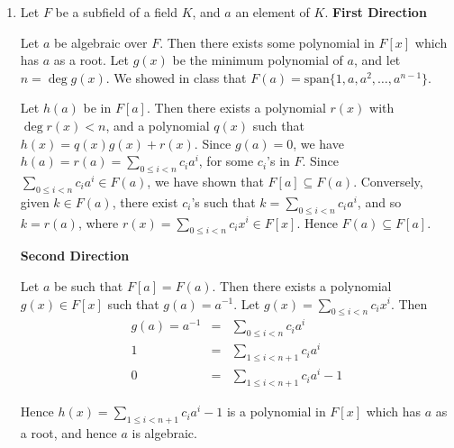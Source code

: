 \documentclass[11pt]{article} \usepackage{amssymb}
\begin{document}
\begin{enumerate}
\begin{itemize}
    \end{itemize}  

  \item
    Let $F$ be a subfield of a field $K$, and $a$ an element of $K$.
    {\bf First Direction}

    Let $a$ be algebraic over $F$. Then there exists some polynomial in $F[x]$
    which has $a$ as a root. Let $g(x)$ be the minimum polynomial of $a$, and
    let $n=\deg g(x)$. 
    We showed in class that $F(a)=\mbox{span}\{1, a, a^2, \ldots, a^{n-1}\}$. 
    
    Let $h(a)$ be in $F[a]$. 
    Then there exists a polynomial
    $r(x)$ with $\deg r(x) < n$, and a polynomial $q(x)$ such that 
    $h(x)=q(x)g(x)+r(x)$. Since $g(a)=0$, we have 
    $h(a)=r(a)=\sum_{0\leq i <n}c_ia^i$, for some $c_i$'s in $F$. Since
    $\sum_{0\leq i <n}c_ia^i \in F(a)$, we have shown that $F[a] \subseteq F(a)$. 
    Conversely, given $k \in F(a)$, there exist $c_i$'s such that $k=\sum_{0\leq i <n}c_ia^i$,
    and so $k=r(a)$, where $r(x)=\sum_{0\leq i <n}c_ix^i \in F[x]$. 
    Hence $F(a) \subseteq F[a]$.

    {\bf Second Direction}

    Let $a$ be such that $F[a]=F(a)$. Then there exists a polynomial 
    $g(x) \in F[x]$ such that $g(a)=a^{-1}$. Let $g(x)=\sum_{0\leq i < n}c_ix^i$. Then
    \begin{eqnarray*}
      g(a)=a^{-1}&=&\sum_{0\leq i < n}c_ia^i
      \\ 1 &=& \sum_{1\leq i < n + 1}c_ia^i
      \\ 0 &=& \sum_{1\leq i < n + 1}c_ia^i - 1
    \end{eqnarray*}
    
    Hence $h(x)=\sum_{1\leq i < n + 1}c_ia^i - 1$ is a polynomial in $F[x]$ which
    has $a$ as a root, and hence $a$ is algebraic.

\end{enumerate}
\end{document}
